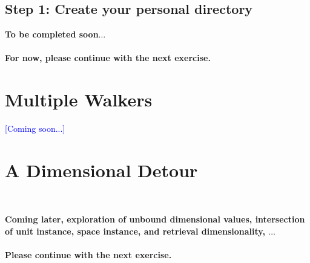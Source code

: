 \documentclass[10pt,twoside,english,pdftex]{article}
\begin{document}
\subsection*{Step 1: Create your personal  directory}

\T\begin{center}
\textcolor{darkergray}{\textsf{\textbf{To be completed soon$\ldots$\\~\\ 
 For now, please continue with the next exercise.}}}
\T\end{center}


\T\markright{}%
\T\pagestyle{plain}
\T\cleardoublepage
\W{}
\T\pagestyle{fancy}
\T\thispagestyle{fancybottom}
\T\renewcommand{\headrulewidth}{0pt}
\section{Multiple Walkers}
\label{sec:detour}%

\textcolor{blue}{[Coming soon...]}



\T\markright{}%
\T\pagestyle{plain}
\T\cleardoublepage
\W{}
\T\pagestyle{fancy}
\T\thispagestyle{fancybottom}
\T\renewcommand{\headrulewidth}{0pt}
\section{A Dimensional Detour}
\label{sec:detour}%


\T\medskip
\T\fndocrule\\
\T\begin{center}
\textcolor{darkergray}{\textsf{\textbf{Coming later, exploration of unbound
 dimensional values, intersection of unit instance, space instance, and retrieval
 dimensionality, $\ldots$\\~\\ 
 Please continue with the next exercise.}}}
\T\end{center}
\T\fndocrule
\end{document}
